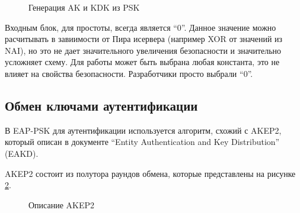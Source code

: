 \begin{figure}[h!]
\caption{Генерация AK и KDK из PSK}
\label{img:key_derivation}
\end{figure}

Входным блок, для простоты, всегда является ``0''. Данное значение можно расчитывать в завиимости от Пира исервера (например XOR от значений из NAI), но это не дает значительного увеличения безопасности и значительно усложняет схему. Для работы может быть выбрана любая константа, это не влияет на свойства безопасности. Разработчики просто выбрали ``0''.

\subsection{Обмен ключами аутентификации}

В EAP-PSK для аутентификации используется алгоритм, схожий с AKEP2, который описан в документе ``Entity Authentication and Key Distribution'' (EAKD).

AKEP2 состоит из полутора раундов обмена, которые представлены на рисунке \ref{img:akep2}.

\begin{figure}[h!]
\caption{Описание AKEP2}
\label{img:akep2}
\end{figure}

